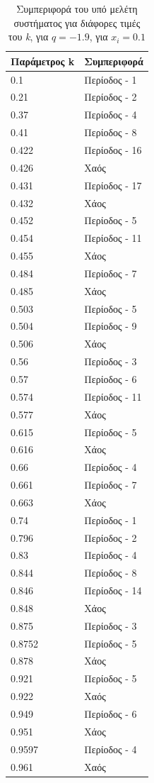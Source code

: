 \begin{table}[ht]
	\centering
	\caption{ Συμπεριφορά του υπό μελέτη συστήματος για διάφορες τιμές του \emph{k}, για $q=-1.9$, για \(x_i=0.1\)}
	\label{tab:abc8}
	\begin{tabular}{l | l}
		Παράμετρος k & Συμπεριφορά \\
		\hline
		0.1 &  Περίοδος -  1 \\
		0.21 &  Περίοδος -  2 \\
		0.37& Περίοδος -  4 \\
		0.41& Περίοδος -  8 \\
		0.422 &  Περίοδος -  16 \\
		0.426& Χαός \\
		0.431& Περίοδος -  17 \\
		0.432& Χάος \\
		0.452 &  Περίοδος -  5 \\
		0.454 &  Περίοδος -  11 \\
		0.455 &  Χάος \\
		0.484 &  Περίοδος -  7\\
		0.485 & Χάος\\
		0.503 & Περίοδος -  5\\
		0.504 & Περίοδος -  9\\
		0.506 &Χάος\\
		0.56 & Περίοδος -  3\\
		0.57 & Περίοδος -  6\\
		0.574 & Περίοδος -  11\\
		0.577 & Χάος\\
		0.615 & Περίοδος -  5\\
		0.616 & Χάος\\
		0.66 & Περίοδος -  4\\
		0.661 & Περίοδος -  7\\
		0.663 & Χάος\\
		0.74 &  Περίοδος -  1\\
		0.796 &  Περίοδος -  2 \\
		0.83& Περίοδος -  4 \\
		0.844& Περίοδος -  8 \\
		0.846 &  Περίοδος -  14 \\
		0.848 &Χάος\\
		0.875& Περίοδος -  3\\
		0.8752 & Περίοδος -  5\\
		0.878 &Χάος\\
		0.921 &  Περίοδος -  5 \\
		0.922& Χαός\\
		0.949 & Περίοδος -  6 \\
		0.951& Χάος \\
		0.9597&Περίοδος -  4\\
		0.961& Χαός\\
		
		
	\end{tabular}
\end{table}

